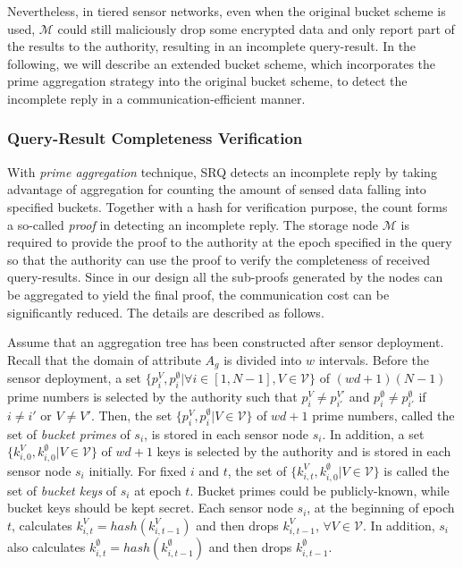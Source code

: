 \documentclass[conference]{IEEEtran}
\begin{document}
Nevertheless, in tiered sensor networks, even when the original bucket scheme is used, $\mathcal{M}$ could still maliciously drop some encrypted data and only report part of the results to the authority, resulting in an incomplete query-result. In the following, we will describe an extended bucket scheme, which incorporates the prime aggregation strategy into the original bucket scheme, to detect the incomplete reply in a communication-efficient manner.

\subsubsection{Query-Result Completeness Verification}\label{sec: Query-Result Completeness Verification}
With \emph{prime aggregation} technique, SRQ detects an incomplete reply by taking advantage of aggregation for counting the amount of sensed data falling into specified buckets. Together with a hash for verification purpose, the count forms a so-called \emph{proof} in detecting an incomplete reply. The storage node $\mathcal{M}$ is required to provide the proof to the authority at the epoch specified in the query so that the authority can use the proof to verify the completeness of received query-results. Since in our design all the sub-proofs generated by the nodes can be aggregated to yield the final proof, the communication cost can be significantly reduced. The details are described as follows.

Assume that an aggregation tree \cite{mfhh02} has been constructed after sensor deployment. Recall that the domain of attribute $A_g$ is divided into $w$ intervals. Before the sensor deployment, a set $\{p_{i}^{V},p_{i}^{\emptyset}|\forall i\in[1,N-1],V\in\mathcal{V}\}$ of $(wd+1)(N-1)$ prime numbers is selected by the authority such that $p_{i}^V\neq p_{i'}^{V'}$ and $p_{i}^{\emptyset}\neq p_{i'}^{\emptyset}$ if $i\neq i'$ or $V\neq V'$. Then, the set $\{p_{i}^{V},p_{i}^{\emptyset}| V\in\mathcal{V}\}$ of $wd+1$ prime numbers, called the set of \emph{bucket primes} of $s_i$, is stored in each sensor node $s_i$. In addition, a set $\{k_{i,0}^{V},k_{i,0}^{\emptyset}|V\in\mathcal{V}\}$ of $wd+1$ keys is selected by the authority and is stored in each sensor node $s_i$ initially. For fixed $i$ and $t$, the set of $\{k_{i,t}^{V},k_{i,0}^{\emptyset}|V\in\mathcal{V}\}$ is called the set of \emph{bucket keys} of $s_i$ at epoch $t$. Bucket primes could be publicly-known, while bucket keys should be kept secret. Each sensor node $s_i$, at the beginning of epoch $t$, calculates $k_{i,t}^{V}=hash(k_{i,t-1}^{V})$ and then drops $k_{i,t-1}^{V}$, $\forall V\in\mathcal{V}$. In addition, $s_i$ also calculates $k_{i,t}^{\emptyset}=hash(k_{i,t-1}^{\emptyset})$ and then drops $k_{i,t-1}^{\emptyset}$.
\end{document}
